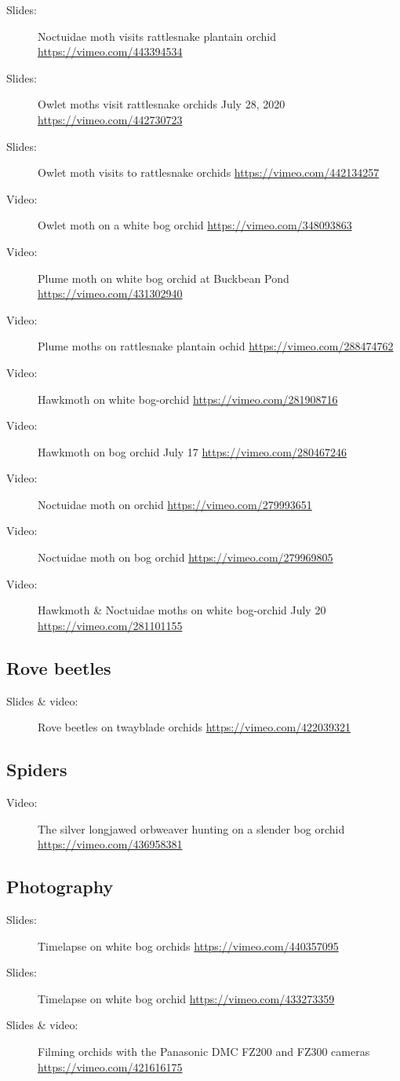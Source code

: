 \begin{description}
\item[Slides:] Noctuidae  moth visits rattlesnake plantain orchid  \url{https://vimeo.com/443394534}
\item[Slides:] Owlet moths visit rattlesnake orchids July 28, 2020 \url{https://vimeo.com/442730723}
\item[Slides:] Owlet moth visits to rattlesnake orchids \url{https://vimeo.com/442134257}
\item[Video:]  Owlet moth on a white bog orchid \url{https://vimeo.com/348093863}
\item[Video:]  Plume moth on white bog orchid at Buckbean Pond \url{https://vimeo.com/431302940}
\item[Video:]  Plume moths on rattlesnake plantain ochid \url{https://vimeo.com/288474762}
\item[Video:]  Hawkmoth on white bog-orchid \url{https://vimeo.com/281908716}
\item[Video:]  Hawkmoth on bog orchid July 17 \url{https://vimeo.com/280467246}
\item[Video:]  Noctuidae moth on orchid \url{https://vimeo.com/279993651}
\item[Video:]  Noctuidae moth on bog orchid \url{https://vimeo.com/279969805}
\item[Video:]  Hawkmoth \& Noctuidae moths on white bog-orchid July 20 \url{https://vimeo.com/281101155}
\end{description}

\subsection{Rove beetles}

\begin{description}
\item[Slides \& video:]  Rove beetles on twayblade orchids \url{https://vimeo.com/422039321}
\end{description}

\subsection{Spiders}

\begin{description}
\item[Video:]  The silver longjawed orbweaver hunting on a slender bog orchid \url{https://vimeo.com/436958381}
\end{description}

\subsection{Photography}

\begin{description}
\item[Slides:] Timelapse on white bog orchids \url{https://vimeo.com/440357095}
\item[Slides:] Timelapse on white bog orchid \url{https://vimeo.com/433273359}
\item[Slides \& video:]  Filming orchids with the Panasonic DMC FZ200 and FZ300 cameras \url{https://vimeo.com/421616175}
\end{description}
